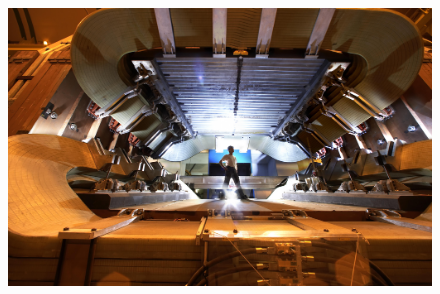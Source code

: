 \begin{frame}
    \begin{figure}[h]
        \centering
        \includegraphics[width=\textwidth]{Figures Introductory Lecture/LHCb Detector/LHCb_Magnet.jpg}%
        \end{figure}
\end{frame}
